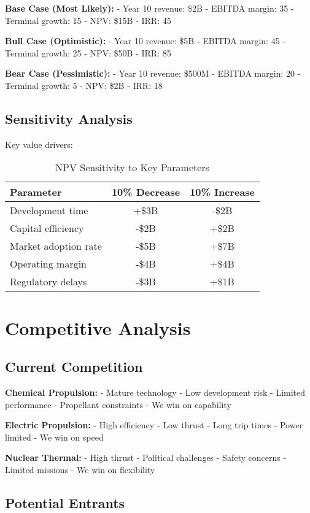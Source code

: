 \documentclass[12pt,letterpaper]{book}
\theoremstyle{definition}
\theoremstyle{plain}
\theoremstyle{remark}
\begin{document}
{{{{{\textbf{Base Case (Most Likely):}
- Year 10 revenue: \$2B
- EBITDA margin: 35%
- Terminal growth: 15%
- NPV: \$15B
- IRR: 45%

\textbf{Bull Case (Optimistic):}
- Year 10 revenue: \$5B
- EBITDA margin: 45%
- Terminal growth: 25%
- NPV: \$50B
- IRR: 85%

\textbf{Bear Case (Pessimistic):}
- Year 10 revenue: \$500M
- EBITDA margin: 20%
- Terminal growth: 5%
- NPV: \$2B
- IRR: 18%

\subsection{Sensitivity Analysis}

Key value drivers:

\begin{table}[h]
\centering
\caption{NPV Sensitivity to Key Parameters}
\begin{tabular}{lcc}
\toprule
Parameter & 10\% Decrease & 10\% Increase \\
\midrule
Development time & +\$3B & -\$2B \\
Capital efficiency & -\$2B & +\$2B \\
Market adoption rate & -\$5B & +\$7B \\
Operating margin & -\$4B & +\$4B \\
Regulatory delays & -\$3B & +\$1B \\
\bottomrule
\end{tabular}
\end{table}

\section{Competitive Analysis}

\subsection{Current Competition}

\textbf{Chemical Propulsion:}
- Mature technology
- Low development risk
- Limited performance
- Propellant constraints
- We win on capability

\textbf{Electric Propulsion:}
- High efficiency
- Low thrust
- Long trip times
- Power limited
- We win on speed

\textbf{Nuclear Thermal:}
- High thrust
- Political challenges
- Safety concerns
- Limited missions
- We win on flexibility

\subsection{Potential Entrants}

}}}}}
\end{document}
